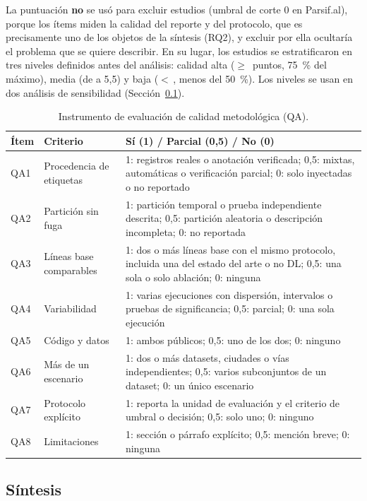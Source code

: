 \documentclass[12pt, a4paper]{article}
\begin{document}
La puntuación \textbf{no} se usó para excluir estudios (umbral de corte 0 en Parsif.al), porque los ítems miden la calidad del reporte y del protocolo, que es precisamente uno de los objetos de la síntesis (RQ2), y excluir por ella ocultaría el problema que se quiere describir. En su lugar, los estudios se estratificaron en tres niveles definidos antes del análisis: calidad alta ($\geq$\,\QAumbralAlta{} puntos, 75~\% del máximo), media (de \QAumbralBaja{} a 5,5) y baja ($<$\,\QAumbralBaja, menos del 50~\%). Los niveles se usan en dos análisis de sensibilidad (Sección~\ref{sec:sintesis}).

\begin{table}[H]
\centering
\small
\caption{Instrumento de evaluación de calidad metodológica (QA).}
\label{tab:cqi}
\begin{tabularx}{\linewidth}{lP{3.6cm}Y}
\toprule
\textbf{Ítem} & \textbf{Criterio} & \textbf{Sí (1) / Parcial (0,5) / No (0)} \\
\midrule
QA1 & Procedencia de etiquetas & 1: registros reales o anotación verificada; 0,5: mixtas, automáticas o verificación parcial; 0: solo inyectadas o no reportado \\
QA2 & Partición sin fuga & 1: partición temporal o prueba independiente descrita; 0,5: partición aleatoria o descripción incompleta; 0: no reportada \\
QA3 & Líneas base comparables & 1: dos o más líneas base con el mismo protocolo, incluida una del estado del arte o no DL; 0,5: una sola o solo ablación; 0: ninguna \\
QA4 & Variabilidad & 1: varias ejecuciones con dispersión, intervalos o pruebas de significancia; 0,5: parcial; 0: una sola ejecución \\
QA5 & Código y datos & 1: ambos públicos; 0,5: uno de los dos; 0: ninguno \\
QA6 & Más de un escenario & 1: dos o más datasets, ciudades o vías independientes; 0,5: varios subconjuntos de un dataset; 0: un único escenario \\
QA7 & Protocolo explícito & 1: reporta la unidad de evaluación y el criterio de umbral o decisión; 0,5: solo uno; 0: ninguno \\
QA8 & Limitaciones & 1: sección o párrafo explícito; 0,5: mención breve; 0: ninguna \\
\bottomrule
\end{tabularx}
\end{table}

\subsection{Síntesis}
\label{sec:sintesis}
\end{document}
